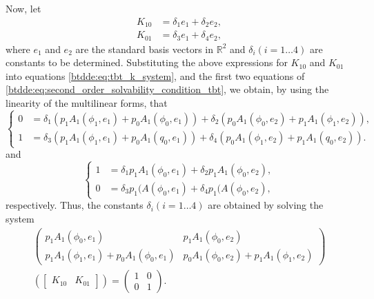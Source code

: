 Now, let
\begin{align*}
K_{10} & = \delta_1e_1 + \delta_2e_2,\\
K_{01} & = \delta_3e_1 + \delta_4e_2,
\end{align*}
where $e_1$ and $e_2$ are the standard basis vectors in $\mathbb R^2$ and
$\delta_i(i = 1\dots4)$ are constants to be determined. Substituting the above
expressions for $K_{10}$ and $K_{01}$ into equations
\cref{btdde:eq:tbt_k_system}, and the first two equations of
\cref{btdde:eq:second_order_solvability_condition_tbt}, we obtain, by using the
linearity of the multilinear forms, that
\begin{equation}
\begin{cases}
0 & = \delta_1\left(p_1A_1(\phi_1,e_1) + p_0A_1(\phi_0,e_1)\right) + \delta_2\left(p_0A_1(\phi_0,e_2) + p_1A_1(\phi_1,e_2)\right),\\
1 & = \delta_3\left(p_1A_1(\phi_1,e_1) + p_0A_1(q_0,e_1)\right) + \delta_4\left(p_0A_1(\phi_1,e_2) + p_1A_1(q_0,e_2)\right).
\end{cases}
\end{equation}
and
\begin{equation}
\begin{cases}
1 & = \delta_1p_1A_1(\phi_0,e_1) + \delta_2p_1A_1(\phi_0,e_2),\\
0 & = \delta_3p_1(A(\phi_0,e_1) + \delta_4p_1(A(\phi_0,e_2),
\end{cases}
\end{equation}
respectively. Thus, the constants $\delta_i(i = 1\dots4)$ are obtained
by solving the system
\begin{multline*}
\left(\begin{array}{cc}
p_1A_1(\phi_0,e_1) & p_1A_1(\phi_0,e_2)\\
p_1A_1(\phi_1,e_1) + p_0A_1(\phi_0,e_1) & p_0A_1(\phi_0,e_2) + p_1A_1(\phi_1,e_2)
\end{array}\right)\\
\left(\left[\begin{array}{cc}
K_{10} & K_{01}\end{array}\right]\right) = \left(\begin{array}{cc}
1 & 0\\
0 & 1
\end{array}\right).
\end{multline*}

